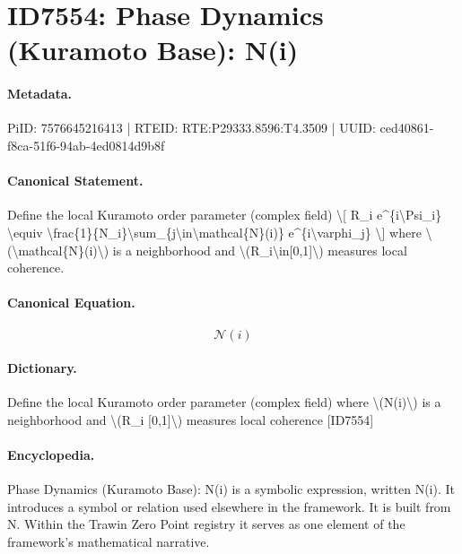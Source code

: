 \section*{ID7554: Phase Dynamics (Kuramoto Base): N(i)}
\paragraph{Metadata.}
PiID: 7576645216413 | RTEID: RTE:P29333.8596:T4.3509 | UUID: ced40861-f8ca-51f6-94ab-4ed0814d9b8f

\paragraph{Canonical Statement.}
Define the local Kuramoto order parameter (complex field) \textbackslash{}[ R\_i e\textasciicircum{}\{i\textbackslash{}Psi\_i\} \textbackslash{}equiv \textbackslash{}frac\{1\}\{N\_i\}\textbackslash{}sum\_\{j\textbackslash{}in\textbackslash{}mathcal\{N\}(i)\} e\textasciicircum{}\{i\textbackslash{}varphi\_j\} \textbackslash{}] where \textbackslash{}(\textbackslash{}mathcal\{N\}(i)\textbackslash{}) is a neighborhood and \textbackslash{}(R\_i\textbackslash{}in[0,1]\textbackslash{}) measures local coherence.

\paragraph{Canonical Equation.}
\[
\mathcal{N}(i)
\]

\paragraph{Dictionary.}
Define the local Kuramoto order parameter (complex field) where \textbackslash{}(N(i)\textbackslash{}) is a neighborhood and \textbackslash{}(R\_i [0,1]\textbackslash{}) measures local coherence [ID7554]

\paragraph{Encyclopedia.}
Phase Dynamics (Kuramoto Base): N(i) is a symbolic expression, written N(i). It introduces a symbol or relation used elsewhere in the framework. It is built from N. Within the Trawin Zero Point registry it serves as one element of the framework's mathematical narrative.
